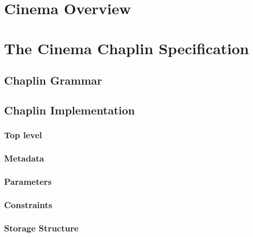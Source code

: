\documentclass{article}
\newcommand{\chaplin} {Chaplin\xspace}
\begin{document}
\tableofcontents
\newpage



\section{Cinema Overview}


\newpage
\section{The Cinema \chaplin Specification}


\subsection{Chaplin Grammar}


\newpage
\subsection{Chaplin Implementation}


\subsubsection{Top level}


\subsubsection{Metadata}


\subsubsection{Parameters}


\subsubsection{Constraints}


\subsubsection{Storage Structure}

\end{document}
